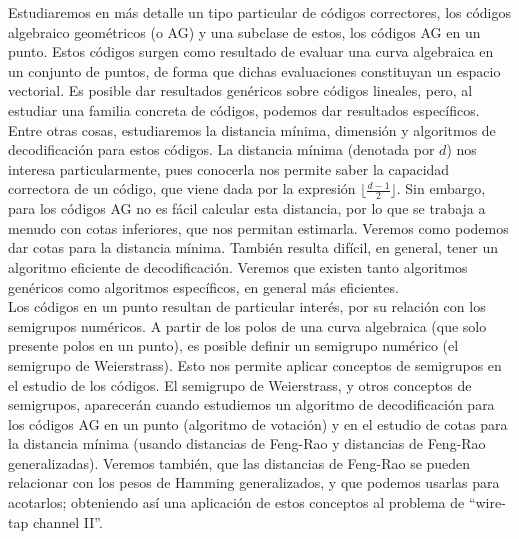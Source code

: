 \documentclass[11pt,spanish]{book}
\begin{document}
Estudiaremos en más detalle un tipo particular de códigos correctores, los códigos algebraico geométricos (o AG) y una subclase de estos, los códigos AG en un punto. Estos códigos surgen como resultado de evaluar una curva algebraica en un conjunto de puntos, de forma que dichas evaluaciones constituyan un espacio vectorial. Es posible dar resultados genéricos sobre códigos lineales, pero, al estudiar una familia concreta de códigos, podemos dar resultados específicos. Entre otras cosas, estudiaremos la distancia mínima, dimensión y algoritmos de decodificación para estos códigos. La distancia mínima (denotada por $d$) nos interesa particularmente, pues conocerla nos permite saber la capacidad correctora de un código, que viene dada por la expresión $\lfloor \frac{d-1}{2}\rfloor$. Sin embargo, para los códigos AG no es fácil calcular esta distancia, por lo que se trabaja a menudo con cotas inferiores, que nos permitan estimarla. Veremos como podemos dar cotas para la distancia mínima.
También resulta difícil, en general, tener un algoritmo eficiente de decodificación. Veremos que existen tanto algoritmos genéricos como algoritmos específicos, en general más eficientes.\\

Los códigos en un punto resultan de particular interés, por su relación con los semigrupos numéricos. A partir de los polos de una curva algebraica (que solo presente polos en un punto), es posible definir un semigrupo numérico (el semigrupo de Weierstrass). Esto nos permite aplicar conceptos de semigrupos en el estudio de los códigos. 
El semigrupo de Weierstrass, y otros conceptos de semigrupos, aparecerán cuando estudiemos un algoritmo de decodificación para los códigos AG en un punto (algoritmo de votación) y en el estudio de cotas para la distancia mínima (usando distancias de Feng-Rao y distancias de Feng-Rao generalizadas). 
Veremos también, que las distancias de Feng-Rao se pueden relacionar con los pesos de Hamming generalizados, y que podemos usarlas para acotarlos; obteniendo así una aplicación de estos conceptos al problema de ``wire-tap channel II''. \\
\end{document}
